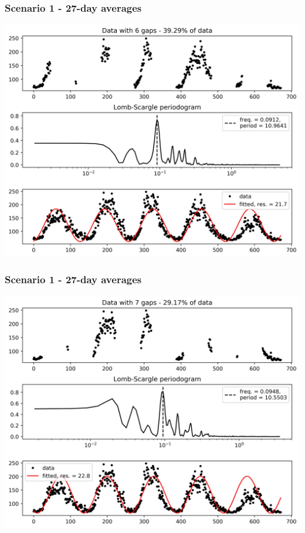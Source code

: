 \documentclass{beamer}
\begin{document}
\begin{frame}
\frametitle{Scenario 1 - 27-day averages}
\begin{center}
\includegraphics[scale=0.55]{../scripts/dataset2/periodograms_ny2.0_model2_Ng6.jpg}
\end{center}
\end{frame}
\begin{frame}
\frametitle{Scenario 1 - 27-day averages}
\begin{center}
\includegraphics[scale=0.55]{../scripts/dataset2/periodograms_ny2.0_model2_Ng7.jpg}
\end{center}
\end{frame}
\end{document}
